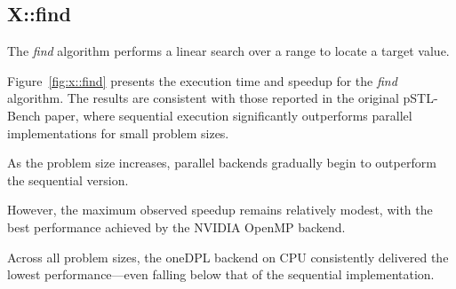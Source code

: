 \documentclass[sigconf]{acmart}
\begin{document}
\subsection{X::find}
The \textit{find} algorithm performs a linear search over a range to locate a
target value.

Figure~\ref{fig:x::find} presents the execution time and speedup for the
\textit{find} algorithm. The results are consistent with those reported in the
original pSTL-Bench paper, where sequential execution significantly outperforms
parallel implementations for small problem sizes.

As the problem size increases, parallel backends gradually begin to outperform
the sequential version.

However, the maximum observed speedup remains relatively modest, with the best
performance achieved by the NVIDIA OpenMP backend.

Across all problem sizes, the oneDPL backend on CPU consistently delivered the
lowest performance—even falling below that of the sequential implementation.
\end{document}
